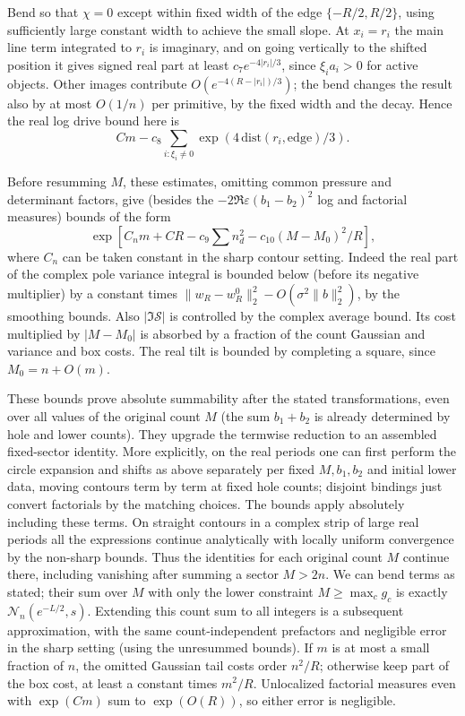 Bend so that \(\chi=0\) except within fixed width of the edge \(\{-R/2,R/2\}\), using sufficiently large constant width to achieve the small slope. At \(x_i=r_i\) the main line term integrated to \(r_i\) is imaginary, and on going vertically to the shifted position it gives signed real part at least \(c_7 e^{-4|r_i|/3}\), since \(\xi_i a_i>0\) for active objects. Other images contribute \(O(e^{-4(R-|r_i|)/3})\); the bend changes the result also by at most \(O(1/n)\) per primitive, by the fixed width and the decay. Hence the real log drive bound here is
\[
 C m-c_8\sum_{i:\xi_i\ne0}\exp(4\,\mathrm{dist}(r_i,\mathrm{edge})/3).
\]

Before resumming \(M\), these estimates, omitting common pressure and determinant factors, give (besides the \(-2\Re\varepsilon(b_1-b_2)^2\) log and factorial measures) bounds of the form
\[
 \exp[C_n m+C R-c_9\sum n_d^2-c_{10}(M-M_0)^2/R],
\]
where \(C_n\) can be taken constant in the sharp contour setting. Indeed the real part of the complex pole variance integral is bounded below (before its negative multiplier) by a constant times \(\|w_R-w_R^0\|_2^2-O(\sigma^2\|b\|_2^2)\), by the smoothing bounds. Also \(|\Im\mathcal S|\) is controlled by the complex average bound. Its cost multiplied by \(|M-M_0|\) is absorbed by a fraction of the count Gaussian and variance and box costs. The real tilt is bounded by completing a square, since \(M_0=n+O(m)\).

These bounds prove absolute summability after the stated transformations, even over all values of the original count \(M\) (the sum \(b_1+b_2\) is already determined by hole and lower counts). They upgrade the termwise reduction to an assembled fixed-sector identity. More explicitly, on the real periods one can first perform the circle expansion and shifts as above separately per fixed \(M,b_1,b_2\) and initial lower data, moving contours term by term at fixed hole counts; disjoint bindings just convert factorials by the matching choices. The bounds apply absolutely including these terms. On straight contours in a complex strip of large real periods all the expressions continue analytically with locally uniform convergence by the non-sharp bounds. Thus the identities for each original count \(M\) continue there, including vanishing after summing a sector \(M>2n\). We can bend terms as stated; their sum over \(M\) with only the lower constraint \(M\ge\max_c g_c\) is exactly \(\mathcal N_n(e^{-L/2},s)\). Extending this count sum to all integers is a subsequent approximation, with the same count-independent prefactors and negligible error in the sharp setting (using the unresummed bounds). If \(m\) is at most a small fraction of \(n\), the omitted Gaussian tail costs order \(n^2/R\); otherwise keep part of the box cost, at least a constant times \(m^2/R\). Unlocalized factorial measures even with \(\exp(C m)\) sum to \(\exp(O(R))\), so either error is negligible.

